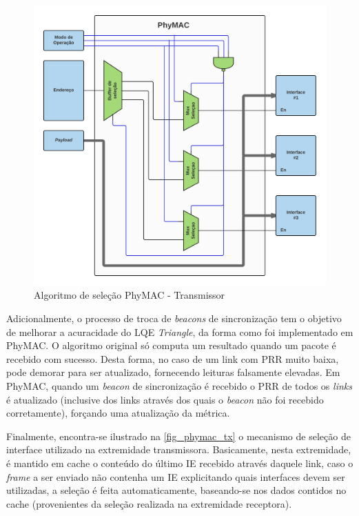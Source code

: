 \documentclass[
	12pt,				%
	openright,			%
	oneside,
	a4paper,			%
	english,			%
	french,				%
	spanish,			%
	brazil				%
	]{abntex2}
\begin{document}
\begin{figure}[htb]
	\centering
	\caption{Algoritmo de seleção PhyMAC - Transmissor}
	\label{fig_phymac_tx}
	\includegraphics[width=.99\linewidth]{PhyMAC_Seletor}
\end{figure}

Adicionalmente, o processo de troca de \textit{beacons} de sincronização tem o objetivo de melhorar a acuracidade do LQE \textit{Triangle}, da forma como foi implementado em PhyMAC. O algoritmo original só computa um resultado quando um pacote é recebido com sucesso. Desta forma, no caso de um link com PRR muito baixa, pode demorar para ser atualizado, fornecendo leituras falsamente elevadas. Em PhyMAC, quando um \textit{beacon} de sincronização é recebido o PRR de todos os \textit{links} é atualizado (inclusive dos links através dos quais o \textit{beacon} não foi recebido corretamente), forçando uma atualização da métrica.

Finalmente, encontra-se ilustrado na \autoref{fig_phymac_tx} o mecanismo de seleção de interface utilizado na extremidade transmissora. Basicamente, nesta extremidade, é mantido em cache o conteúdo do último IE recebido através daquele link, caso o \textit{frame} a ser enviado não contenha um IE explicitando quais interfaces devem ser utilizadas, a seleção é feita automaticamente, baseando-se nos dados contidos no cache (provenientes da seleção realizada na extremidade receptora).
\end{document}
